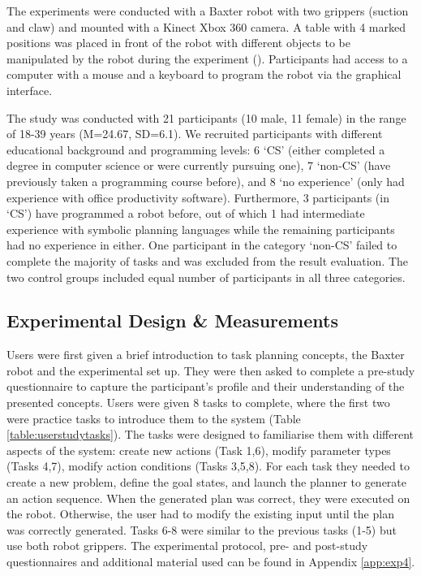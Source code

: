 The experiments were conducted with a Baxter robot with two grippers (suction and claw) and mounted with a Kinect Xbox 360 camera. 
A table with 4 marked positions was placed in front of the robot with different objects to be manipulated by the robot during the experiment ().
Participants had access to a computer with a mouse and a keyboard to program the robot via the graphical interface.

The study was conducted with 21 participants (10 male, 11 female) in the range of 18-39 years (M=24.67, SD=6.1).
We recruited participants with different educational background and programming levels: 
6 `CS' (either completed a degree in computer science or were currently pursuing one),
7 `non-CS' (have previously taken a programming course before), 
and 8 `no experience' (only had experience with office productivity software).
Furthermore, 3 participants (in `CS') have programmed a robot before, out of which 1 had intermediate experience with symbolic planning languages while the remaining participants had no experience in either.
One participant in the category `non-CS' failed to complete the majority of tasks and was excluded from the result evaluation.
The two control groups included equal number of participants in all three categories.

\subsection{Experimental Design \& Measurements}
Users were first given a brief introduction to task planning concepts, the Baxter robot and the experimental set up.
They were then asked to complete a pre-study questionnaire to capture the participant's profile and their understanding of the presented concepts.
Users were given 8 tasks to complete, where the first two were practice tasks to introduce them to the system (Table \ref{table:userstudytasks}). 
The tasks were designed to familiarise them with different aspects of the system:
create new actions (Task 1,6), modify parameter types (Tasks 4,7), modify action conditions (Tasks 3,5,8).
For each task they needed to create a new problem, define the goal states, and launch the planner to generate an action sequence.
When the generated plan was correct, they were executed on the robot.
Otherwise, the user had to modify the existing input until the plan was correctly generated.
Tasks 6-8 were similar to the previous tasks (1-5) but use both robot grippers.
The experimental protocol, pre- and post-study questionnaires and additional material used can be found in Appendix \ref{app:exp4}.


